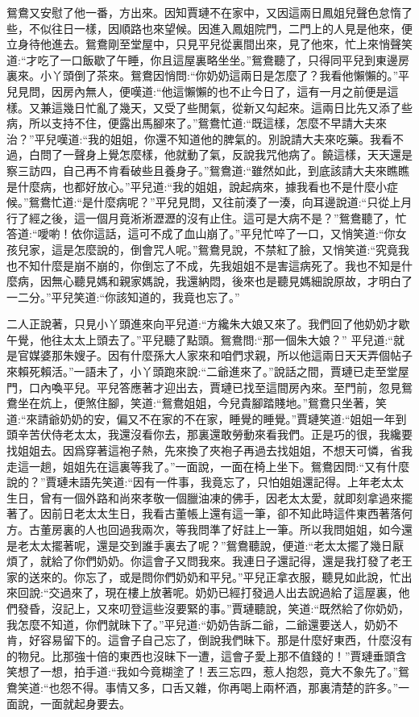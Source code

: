 \begin{parag}
    鴛鴦又安慰了他一番，方出來。因知賈璉不在家中，又因這兩日鳳姐兒聲色怠惰了些，不似往日一樣，因順路也來望候。因進入鳳姐院門，二門上的人見是他來，便立身待他進去。鴛鴦剛至堂屋中，只見平兒從裏間出來，見了他來，忙上來悄聲笑道:“才吃了一口飯歇了午睡，你且這屋裏略坐坐。”鴛鴦聽了，只得同平兒到東邊房裏來。小丫頭倒了茶來。鴛鴦因悄問:“你奶奶這兩日是怎麼了？我看他懶懶的。”平兒見問，因房內無人，便嘆道:“他這懶懶的也不止今日了，這有一月之前便是這樣。又兼這幾日忙亂了幾天，又受了些閒氣，從新又勾起來。這兩日比先又添了些病，所以支持不住，便露出馬腳來了。”鴛鴦忙道:“既這樣，怎麼不早請大夫來治？”平兒嘆道:“我的姐姐，你還不知道他的脾氣的。別說請大夫來吃藥。我看不過，白問了一聲身上覺怎麼樣，他就動了氣，反說我咒他病了。饒這樣，天天還是察三訪四，自己再不肯看破些且養身子。”鴛鴦道:“雖然如此，到底該請大夫來瞧瞧是什麼病，也都好放心。”平兒道:“我的姐姐，說起病來，據我看也不是什麼小症候。”鴛鴦忙道:“是什麼病呢？”平兒見問，又往前湊了一湊，向耳邊說道:“只從上月行了經之後，這一個月竟淅淅瀝瀝的沒有止住。這可是大病不是？”鴛鴦聽了，忙答道:“噯喲！依你這話，這可不成了血山崩了。”平兒忙啐了一口，又悄笑道:“你女孩兒家，這是怎麼說的，倒會咒人呢。”鴛鴦見說，不禁紅了臉，又悄笑道:“究竟我也不知什麼是崩不崩的，你倒忘了不成，先我姐姐不是害這病死了。我也不知是什麼病，因無心聽見媽和親家媽說，我還納悶，後來也是聽見媽細說原故，才明白了一二分。”平兒笑道:“你該知道的，我竟也忘了。”
\end{parag}


\begin{parag}
    二人正說著，只見小丫頭進來向平兒道:“方纔朱大娘又來了。我們回了他奶奶才歇午覺，他往太太上頭去了。”平兒聽了點頭。鴛鴦問:“那一個朱大娘？” 平兒道:“就是官媒婆那朱嫂子。因有什麼孫大人家來和咱們求親，所以他這兩日天天弄個帖子來賴死賴活。”一語未了，小丫頭跑來說:“二爺進來了。”說話之間，賈璉已走至堂屋門，口內喚平兒。平兒答應著才迎出去，賈璉已找至這間房內來。至門前，忽見鴛鴦坐在炕上，便煞住腳，笑道:“鴛鴦姐姐，今兒貴腳踏賤地。”鴛鴦只坐著，笑道:“來請爺奶奶的安，偏又不在家的不在家，睡覺的睡覺。”賈璉笑道:“姐姐一年到頭辛苦伏侍老太太，我還沒看你去，那裏還敢勞動來看我們。正是巧的很，我纔要找姐姐去。因爲穿著這袍子熱，先來換了夾袍子再過去找姐姐，不想天可憐，省我走這一趟，姐姐先在這裏等我了。”一面說，一面在椅上坐下。鴛鴦因問:“又有什麼說的？”賈璉未語先笑道:“因有一件事，我竟忘了，只怕姐姐還記得。上年老太太生日，曾有一個外路和尚來孝敬一個臘油凍的佛手，因老太太愛，就即刻拿過來擺著了。因前日老太太生日，我看古董帳上還有這一筆，卻不知此時這件東西著落何方。古董房裏的人也回過我兩次，等我問準了好註上一筆。所以我問姐姐，如今還是老太太擺著呢，還是交到誰手裏去了呢？”鴛鴦聽說，便道:“老太太擺了幾日厭煩了，就給了你們奶奶。你這會子又問我來。我連日子還記得，還是我打發了老王家的送來的。你忘了，或是問你們奶奶和平兒。”平兒正拿衣服，聽見如此說，忙出來回說:“交過來了，現在樓上放著呢。奶奶已經打發過人出去說過給了這屋裏，他們發昏，沒記上，又來叨登這些沒要緊的事。”賈璉聽說，笑道:“既然給了你奶奶，我怎麼不知道，你們就昧下了。”平兒道:“奶奶告訴二爺，二爺還要送人，奶奶不肯，好容易留下的。這會子自己忘了，倒說我們昧下。那是什麼好東西，什麼沒有的物兒。比那強十倍的東西也沒昧下一遭，這會子愛上那不值錢的！”賈璉垂頭含笑想了一想，拍手道:“我如今竟糊塗了！丟三忘四，惹人抱怨，竟大不象先了。”鴛鴦笑道:“也怨不得。事情又多，口舌又雜，你再喝上兩杯酒，那裏清楚的許多。”一面說，一面就起身要去。
\end{parag}


